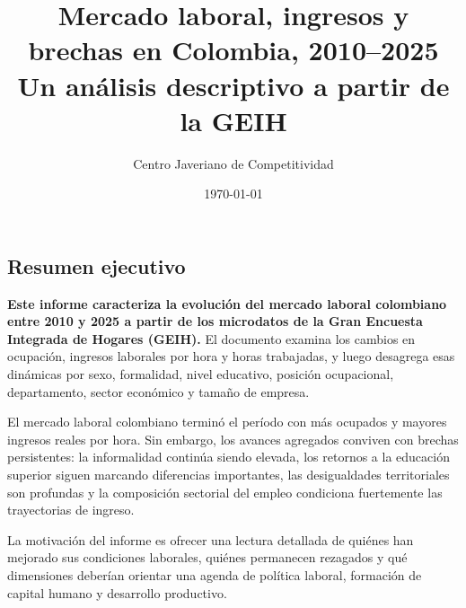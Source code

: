 \documentclass[12pt, a4paper]{article}
\title{Mercado laboral, ingresos y brechas en Colombia, 2010--2025\\
Un análisis descriptivo a partir de la GEIH}
\author{Centro Javeriano de Competitividad}
\date{\today}
\begin{document}
\maketitle
\begin{mdframed}[
  linewidth=1pt,
  linecolor=gray!60,
  backgroundcolor=gray!6,
  innertopmargin=12pt,
  innerbottommargin=12pt,
  innerleftmargin=14pt,
  innerrightmargin=14pt
]
\section*{Resumen ejecutivo}
\textbf{Este informe caracteriza la evolución del mercado laboral colombiano entre 2010 y 2025 a partir de los microdatos de la Gran Encuesta Integrada de Hogares (GEIH).} El documento examina los cambios en ocupación, ingresos laborales por hora y horas trabajadas, y luego desagrega esas dinámicas por sexo, formalidad, nivel educativo, posición ocupacional, departamento, sector económico y tamaño de empresa.

El mercado laboral colombiano terminó el período con más ocupados y mayores ingresos reales por hora. Sin embargo, los avances agregados conviven con brechas persistentes: la informalidad continúa siendo elevada, los retornos a la educación superior siguen marcando diferencias importantes, las desigualdades territoriales son profundas y la composición sectorial del empleo condiciona fuertemente las trayectorias de ingreso.

La motivación del informe es ofrecer una lectura detallada de quiénes han mejorado sus condiciones laborales, quiénes permanecen rezagados y qué dimensiones deberían orientar una agenda de política laboral, formación de capital humano y desarrollo productivo.
\end{mdframed}





\end{document}
